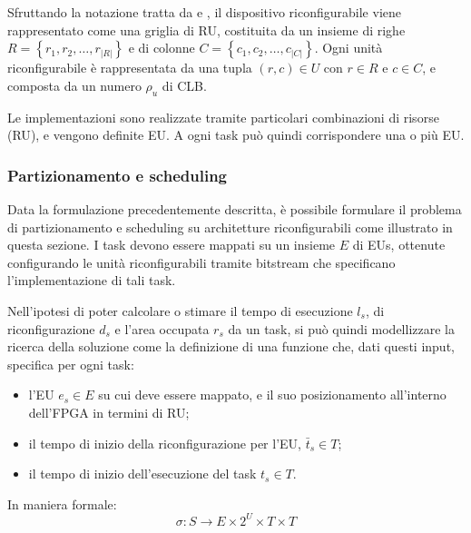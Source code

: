 Sfruttando la notazione tratta da \cite{ModelloRedaelli}
e \cite{ReconfigurableSystemDesignVerification}, il dispositivo riconfigurabile viene 
rappresentato come una griglia di \ac{RU}, costituita da un insieme di righe
$R=\left\{r_1, r_2, \dots, r_{\vert R \vert}\right\}$ e 
di colonne $C=\left\{c_1, c_2, \dots, c_{\vert C \vert}\right\}$. Ogni unità 
riconfigurabile è rappresentata da una tupla $(r,c) \in U$ con $r \in R$ e $c \in C$, e 
composta da un numero $\rho_{u}$ di \ac{CLB}.

Le implementazioni sono realizzate tramite particolari combinazioni di risorse (\ac{RU}),
e vengono definite \ac{EU}. A ogni task può quindi corrispondere una o più \ac{EU}.

\subsubsection{Partizionamento e scheduling}
Data la formulazione precedentemente descritta, è possibile formulare il problema
di partizionamento e scheduling su architetture riconfigurabili come illustrato in questa
sezione. I task devono essere mappati su un insieme $E$ di \acp{EU}, 
ottenute configurando le unità riconfigurabili tramite bitstream che specificano 
l'implementazione di tali task.

Nell'ipotesi di poter calcolare o stimare il tempo di esecuzione $l_{s}$, di 
riconfigurazione $d_{s}$ e l'area occupata $r_{s}$ da un task, si può quindi modellizzare 
la ricerca della soluzione come la definizione di una funzione 
che, dati questi input, specifica per ogni task:
\begin{itemize}
 \item l'\ac{EU} $e_s \in E$ su cui deve essere mappato, e il suo posizionamento 
all'interno dell'\ac{FPGA} in termini di \ac{RU};
 \item il tempo di inizio della riconfigurazione per l'\ac{EU}, $\bar{t}_s \in T$;
 \item il tempo di inizio dell'esecuzione del task $t_s \in T$.
\end{itemize}

In maniera formale:
\begin{equation}
\label{formula:mappingScheduling}
 \sigma : S \rightarrow E \times 2^{U} \times T \times T
\end{equation}

